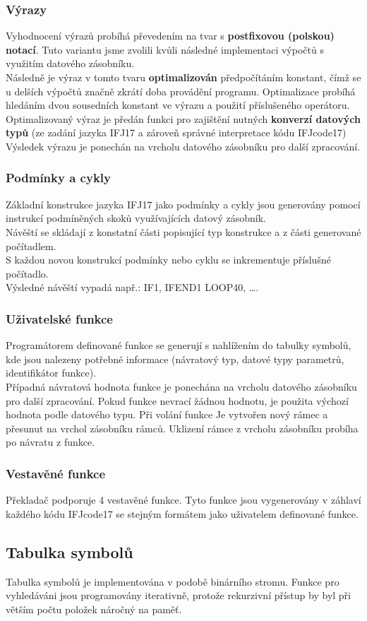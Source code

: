 \documentclass[11pt, a4paper]{article}
\begin{document}
	\subsubsection{Výrazy}
    Vyhodnocení výrazů probíhá převedením na tvar s {\bf postfixovou (polskou) notací}. Tuto variantu jsme zvolili kvůli následné implementaci výpočtů s využitím datového zásobníku.\\
    \indent Následně je výraz v tomto tvaru {\bf optimalizován} předpočítáním konstant, čímž se u delších výpočtů značně zkrátí doba provádění programu. Optimalizace probíhá hledáním dvou sousedních konstant ve výrazu a použití příslušeného operátoru.\\
    \indent Optimalizovaný výraz je předán funkci pro zajištění nutných {\bf konverzí datových typů} (ze zadání jazyka IFJ17 a zároveň správné interpretace kódu IFJcode17)\\
    Výsledek výrazu je ponechán na vrcholu datového zásobníku pro další zpracování.
    \subsubsection{Podmínky a cykly}
    Základní konstrukce jazyka IFJ17 jako podmínky a cykly jsou generovány pomocí instrukcí podmíněných skoků využívajících datový zásobník.\\
    \indent Návěští se skládají z konstatní části popisující typ konstrukce a z části generované počítadlem.\\S každou novou konstrukcí podmínky nebo cyklu se inkrementuje příslušné počítadlo.\\Výsledné návěští vypadá např.: IF1, IFEND1 LOOP40, \ldots .
    \subsubsection{Uživatelské funkce}
    Programátorem definované funkce se generují s nahlížením do tabulky symbolů, kde jsou nalezeny potřebné informace (návratový typ, datové typy parametrů, identifikátor funkce).\\
    \indent Případná návratová hodnota funkce je ponechána na vrcholu datového zásobníku pro další zpracování. Pokud funkce nevrací žádnou hodnotu, je použita výchozí hodnota podle datového typu.
    \indent Při volání funkce Je vytvořen nový rámec a přesunut na vrchol zásobníku rámců. Uklizení rámce z vrcholu zásobníku probíha po návratu z funkce.
        \subsubsection{Vestavěné funkce}
    Překladač podporuje 4 vestavěné funkce. Tyto funkce jsou vygenerovány v záhlaví každého kódu IFJcode17 se stejným formátem jako uživatelem definované funkce.
\subsection{Tabulka symbolů}
    Tabulka symbolů je implementována v podobě binárního stromu. Funkce pro vyhledáváni jsou programovány iterativně, protože rekurzivní přístup by byl při větším počtu položek náročný na paměť.
\end{document}
